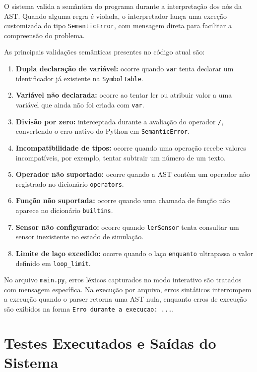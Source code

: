 \documentclass[12pt,a4paper]{article}
\begin{document}
O sistema valida a semântica do programa durante a interpretação dos nós da AST. Quando alguma regra é violada, o interpretador lança uma exceção customizada do tipo \texttt{SemanticError}, com mensagem direta para facilitar a compreensão do problema.

As principais validações semânticas presentes no código atual são:

\begin{enumerate}
    \item \textbf{Dupla declaração de variável:} ocorre quando \texttt{var} tenta declarar um identificador já existente na \texttt{SymbolTable}.
    \item \textbf{Variável não declarada:} ocorre ao tentar ler ou atribuir valor a uma variável que ainda não foi criada com \texttt{var}.
    \item \textbf{Divisão por zero:} interceptada durante a avaliação do operador \texttt{/}, convertendo o erro nativo do Python em \texttt{SemanticError}.
    \item \textbf{Incompatibilidade de tipos:} ocorre quando uma operação recebe valores incompatíveis, por exemplo, tentar subtrair um número de um texto.
    \item \textbf{Operador não suportado:} ocorre quando a AST contém um operador não registrado no dicionário \texttt{operators}.
    \item \textbf{Função não suportada:} ocorre quando uma chamada de função não aparece no dicionário \texttt{builtins}.
    \item \textbf{Sensor não configurado:} ocorre quando \texttt{lerSensor} tenta consultar um sensor inexistente no estado de simulação.
    \item \textbf{Limite de laço excedido:} ocorre quando o laço \texttt{enquanto} ultrapassa o valor definido em \texttt{loop\_limit}.
\end{enumerate}

No arquivo \texttt{main.py}, erros léxicos capturados no modo interativo são tratados com mensagem específica. Na execução por arquivo, erros sintáticos interrompem a execução quando o parser retorna uma AST nula, enquanto erros de execução são exibidos na forma \texttt{Erro durante a execucao: ...}.


\section{Testes Executados e Saídas do Sistema}
\end{document}
